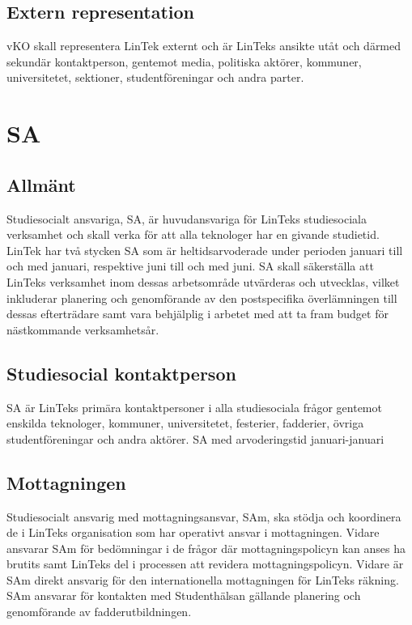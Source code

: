 \hypertarget{extern-representation-1}{%
\subsection{Extern representation}\label{extern-representation-1}}

vKO skall representera LinTek externt och är LinTeks ansikte utåt och
därmed sekundär kontaktperson, gentemot media, politiska aktörer,
kommuner, universitetet, sektioner, studentföreningar och andra parter.

\hypertarget{sa}{%
\section{SA}\label{sa}}

\hypertarget{allmuxe4nt-2}{%
\subsection{Allmänt}\label{allmuxe4nt-2}}

Studiesocialt ansvariga, SA, är huvudansvariga för LinTeks studiesociala
verksamhet och skall verka för att alla teknologer har en givande
studietid. LinTek har två stycken SA som är heltidsarvoderade under
perioden januari till och med januari, respektive juni till och med
juni. SA skall säkerställa att LinTeks verksamhet inom dessas
arbetsområde utvärderas och utvecklas, vilket inkluderar planering och
genomförande av den postspecifika överlämningen till dessas efterträdare
samt vara behjälplig i arbetet med att ta fram budget för nästkommande
verksamhetsår.

\hypertarget{studiesocial-kontaktperson}{%
\subsection{Studiesocial
kontaktperson}\label{studiesocial-kontaktperson}}

SA är LinTeks primära kontaktpersoner i alla studiesociala frågor
gentemot enskilda teknologer, kommuner, universitetet, festerier,
fadderier, övriga studentföreningar och andra aktörer. SA med
arvoderingstid januari-januari

\hypertarget{mottagningen}{%
\subsection{Mottagningen}\label{mottagningen}}

Studiesocialt ansvarig med mottagningsansvar, SAm, ska stödja och
koordinera de i LinTeks organisation som har operativt ansvar i
mottagningen. Vidare ansvarar SAm för bedömningar i de frågor där
mottagningspolicyn kan anses ha brutits samt LinTeks del i processen att
revidera mottagningspolicyn. Vidare är SAm direkt ansvarig för den
internationella mottagningen för LinTeks räkning. SAm ansvarar för
kontakten med Studenthälsan gällande planering och genomförande av
fadderutbildningen.

